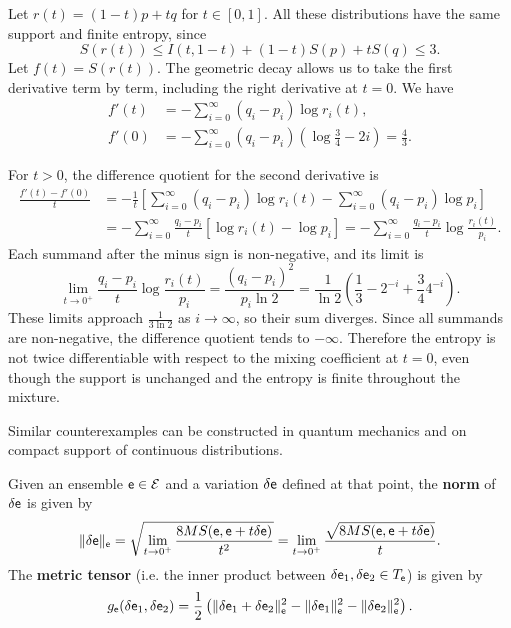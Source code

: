 \begin{mathSection}
\begin{remark}
	Let $r(t) = (1-t)p+tq$ for $t \in [0,1]$. All these distributions have the same support and finite entropy, since
	$$ S(r(t)) \leq I(t,1-t)+(1-t)S(p)+tS(q) \leq 3. $$
	Let $f(t)=S(r(t))$. The geometric decay allows us to take the first derivative term by term, including the right derivative at $t=0$. We have
	\begin{equation}
		\begin{aligned}
			f'(t) &= -\sum_{i=0}^{\infty}(q_i-p_i)\log r_i(t), \\
			f'(0) &= -\sum_{i=0}^{\infty}(q_i-p_i)\left(\log\frac{3}{4}-2i\right) = \frac{4}{3}.
		\end{aligned}
	\end{equation}
	
	For $t>0$, the difference quotient for the second derivative is
	\begin{equation}
	\begin{aligned}
		\frac{f'(t)-f'(0)}{t}
		&= -\frac{1}{t}\left[\sum_{i=0}^{\infty}(q_i-p_i)\log r_i(t)-\sum_{i=0}^{\infty}(q_i-p_i)\log p_i\right] \\
		&= -\sum_{i=0}^{\infty}\frac{q_i-p_i}{t}\left[\log r_i(t)-\log p_i\right] = -\sum_{i=0}^{\infty}\frac{q_i-p_i}{t}\log\frac{r_i(t)}{p_i}.
	\end{aligned}
	\end{equation}
	Each summand after the minus sign is non-negative, and its limit is
	\begin{equation}
		\lim_{t\to0^+}\frac{q_i-p_i}{t}\log\frac{r_i(t)}{p_i}
		= \frac{(q_i-p_i)^2}{p_i\ln 2}
		= \frac{1}{\ln 2}\left(\frac{1}{3}-2^{-i}+\frac{3}{4}4^{-i}\right).
	\end{equation}
	These limits approach $\frac{1}{3\ln 2}$ as $i\to\infty$, so their sum diverges. Since all summands are non-negative, the difference quotient tends to $-\infty$. Therefore the entropy is not twice differentiable with respect to the mixing coefficient at $t=0$, even though the support is unchanged and the entropy is finite throughout the mixture.
	
	Similar counterexamples can be constructed in quantum mechanics and on compact support of continuous distributions.
\end{remark}

\begin{defn}
	Given an ensemble $\mathsf{e} \in \mathcal{E}$ and a variation $\delta \mathsf{e}$ defined at that point, the \textbf{norm} of $\delta \mathsf{e}$ is given by
	$$ \lVert \delta \mathsf{e} \rVert_{\mathsf{e}} =\sqrt{\lim_{t\to0^+}\frac{8MS(\mathsf{e},\mathsf{e}+t\delta\mathsf{e})}{t^2}}=\lim_{t\to0^+}\frac{\sqrt{8MS(\mathsf{e},\mathsf{e}+t\delta\mathsf{e})}}{t}.$$
	The \textbf{metric tensor} (i.e. the inner product between $\delta \mathsf{e}_1 , \delta \mathsf{e}_2 \in T_{\mathsf{e}}$) is given by
	$$ g_{\mathsf{e}}( \delta \mathsf{e}_1, \delta \mathsf{e}_2 ) = \frac{1}{2} \left( \lVert \delta \mathsf{e}_1 + \delta \mathsf{e}_2 \rVert_{\mathsf{e}}^2 - \lVert \delta \mathsf{e}_1 \rVert_{\mathsf{e}}^2 - \lVert \delta \mathsf{e}_2 \rVert_{\mathsf{e}}^2 \right).$$
\end{defn}


\end{mathSection}
